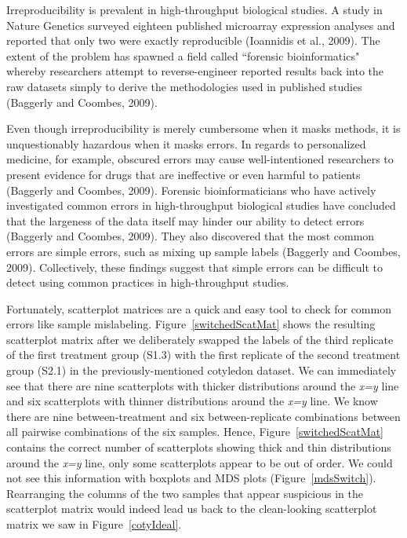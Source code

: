 \documentclass[useAMS,referee]{biom}
\begin{document}
Irreproducibility is prevalent in high-throughput biological studies. A study in Nature Genetics surveyed eighteen published microarray expression analyses and reported that only two were exactly reproducible (Ioannidis et al., 2009). The extent of the problem has spawned a field called ``forensic bioinformatics" whereby researchers attempt to reverse-engineer reported results back into the raw datasets simply to derive the methodologies used in published studies (Baggerly and Coombes, 2009).

Even though irreproducibility is merely cumbersome when it masks methods, it is unquestionably hazardous when it masks errors. In regards to personalized medicine, for example, obscured errors may cause well-intentioned researchers to present evidence for drugs that are ineffective or even harmful to patients (Baggerly and Coombes, 2009). Forensic bioinformaticians who have actively investigated common errors in high-throughput biological studies have concluded that the largeness of the data itself may hinder our ability to detect errors (Baggerly and Coombes, 2009). They also discovered that the most common errors are simple errors, such as mixing up sample labels (Baggerly and Coombes, 2009). Collectively, these findings suggest that simple errors can be difficult to detect using common practices in high-throughput studies.

Fortunately, scatterplot matrices are a quick and easy tool to check for common errors like sample mislabeling. Figure~\ref{switchedScatMat} shows the resulting scatterplot matrix after we deliberately swapped the labels of the third replicate of the first treatment group (S1.3) with the first replicate of the second treatment group (S2.1) in the previously-mentioned cotyledon dataset. We can immediately see that there are nine scatterplots with thicker distributions around the \textit{x=y} line and six scatterplots with thinner distributions around the \textit{x=y} line. We know there are nine between-treatment and six between-replicate combinations between all pairwise combinations of the six samples. Hence, Figure~\ref{switchedScatMat} contains the correct number of scatterplots showing thick and thin distributions around the \textit{x=y} line, only some scatterplots appear to be out of order. We could not see this information with boxplots and MDS plots (Figure~\ref{mdsSwitch}). Rearranging the columns of the two samples that appear suspicious in the scatterplot matrix would indeed lead us back to the clean-looking scatterplot matrix we saw in Figure~\ref{cotyIdeal}.
\end{document}

